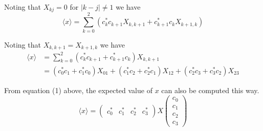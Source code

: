 \documentclass[12pt]{article}
\begin{document}
\noindent
Noting that $X_{kj}=0$ for $|k-j|\ne1$ we have
\begin{equation*}
\langle x\rangle=\sum_{k=0}^2\left(c_k^*c_{k+1}X_{k,k+1}+c_{k+1}^*c_kX_{k+1,k}\right)
\end{equation*}

\noindent
Noting that $X_{k,k+1}=X_{k+1,k}$ we have
\begin{align*}
\langle x\rangle&=\sum_{k=0}^2\left(c_k^*c_{k+1}+c_{k+1}^*c_k\right)X_{k,k+1}
\\
&=(c_0^*c_1+c_1^*c_0)X_{01}+(c_1^*c_2+c_2^*c_1)X_{12}+(c_2^*c_3+c_3^*c_2)X_{23}
\end{align*}

\noindent
From equation (1) above, the expected value of $x$ can also be computed this way.
\begin{equation*}
\langle x\rangle=\begin{pmatrix}c_0^* & c_1^* & c_2^* & c_3^*\end{pmatrix}
X\begin{pmatrix}c_0\\ c_1\\ c_2\\ c_3\end{pmatrix}
\end{equation*}
\end{document}
